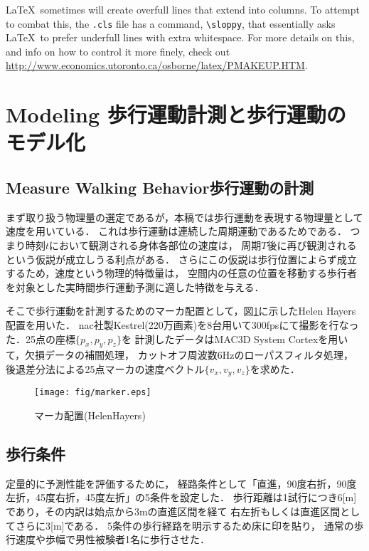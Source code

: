 \documentclass{sigchi}
\begin{document}
\LaTeX\ sometimes will create overfull lines that extend into columns.
To attempt to combat this, the \texttt{.cls} file has a command,
\texttt{{\textbackslash}sloppy}, that essentially asks \LaTeX\ to
prefer underfull lines with extra whitespace.  For more details on
this, and info on how to control it more finely, check out
{\url{http://www.economics.utoronto.ca/osborne/latex/PMAKEUP.HTM}}.
\section{Modeling 歩行運動計測と歩行運動のモデル化}%

\subsection{Measure Walking Behavior歩行運動の計測}
\label{subsec-nac}



まず取り扱う物理量の選定であるが，本稿では歩行運動を表現する物理量として速度を用いている．
これは歩行運動は連続した周期運動であるためである．
つまり時刻$t$において観測される身体各部位の速度は，
周期$T$後に再び観測されるという仮説が成立しうる利点がある．
さらにこの仮説は歩行位置によらず成立するため，速度という物理的特徴量は，
空間内の任意の位置を移動する歩行者を対象とした実時間歩行運動予測に適した特徴を与える．

そこで歩行運動を計測するためのマーカ配置として，図\ref{fig-marker}に示したHelen Hayers配置を用いた．
nac社製Kestrel(220万画素)を8台用いて300fpsにて撮影を行なった．25点の座標$\{p_x,p_y,p_z\}$を
計測したデータはMAC3D System Cortexを用いて，欠損データの補間処理，
カットオフ周波数6Hzのローパスフィルタ処理，
後退差分法による25点マーカの速度ベクトル$\{v_x,v_y,v_z\}$を求めた．
\begin{figure}[tb]
  \begin{center}
  \vspace*{-6mm}
    \texttt{[image: fig/marker.eps]}
  \end{center}
  \vspace*{-6mm}
  \caption{マーカ配置(HelenHayers)}
  \label{fig-marker}
\end{figure}




\subsection{歩行条件}

定量的に予測性能を評価するために，
経路条件として「直進，90度右折，90度左折，45度右折，45度左折」の5条件を設定した．
歩行距離は1試行につき6[m]であり，その内訳は始点から3mの直進区間を経て
右左折もしくは直進区間としてさらに3[m]である．
5条件の歩行経路を明示するため床に印を貼り，
通常の歩行速度や歩幅で男性被験者1名に歩行させた．
\end{document}
